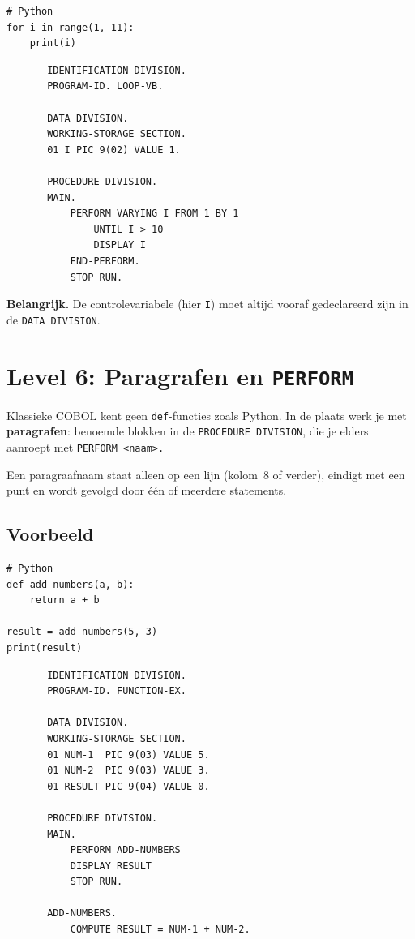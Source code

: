 \documentclass[11pt,a4paper]{article}
\begin{document}
\begin{lstlisting}
# Python
for i in range(1, 11):
    print(i)
\end{lstlisting}

\begin{lstlisting}
       IDENTIFICATION DIVISION.
       PROGRAM-ID. LOOP-VB.

       DATA DIVISION.
       WORKING-STORAGE SECTION.
       01 I PIC 9(02) VALUE 1.

       PROCEDURE DIVISION.
       MAIN.
           PERFORM VARYING I FROM 1 BY 1
               UNTIL I > 10
               DISPLAY I
           END-PERFORM.
           STOP RUN.
\end{lstlisting}

\textbf{Belangrijk.} De controlevariabele (hier \texttt{I}) moet altijd vooraf gedeclareerd zijn in de \texttt{DATA DIVISION}.

\section{Level 6: Paragrafen en \texttt{PERFORM}}

Klassieke COBOL kent geen \texttt{def}-functies zoals Python. 
In de plaats werk je met \textbf{paragrafen}: benoemde blokken in de \texttt{PROCEDURE DIVISION}, die je elders aanroept met \texttt{PERFORM <naam>.}

Een paragraafnaam staat alleen op een lijn (kolom~8 of verder), eindigt met een punt en wordt gevolgd door één of meerdere statements.

\subsection*{Voorbeeld}

\begin{lstlisting}
# Python
def add_numbers(a, b):
    return a + b

result = add_numbers(5, 3)
print(result)
\end{lstlisting}

\begin{lstlisting}
       IDENTIFICATION DIVISION.
       PROGRAM-ID. FUNCTION-EX.

       DATA DIVISION.
       WORKING-STORAGE SECTION.
       01 NUM-1  PIC 9(03) VALUE 5.
       01 NUM-2  PIC 9(03) VALUE 3.
       01 RESULT PIC 9(04) VALUE 0.

       PROCEDURE DIVISION.
       MAIN.
           PERFORM ADD-NUMBERS
           DISPLAY RESULT
           STOP RUN.

       ADD-NUMBERS.
           COMPUTE RESULT = NUM-1 + NUM-2.
\end{lstlisting}
\end{document}
